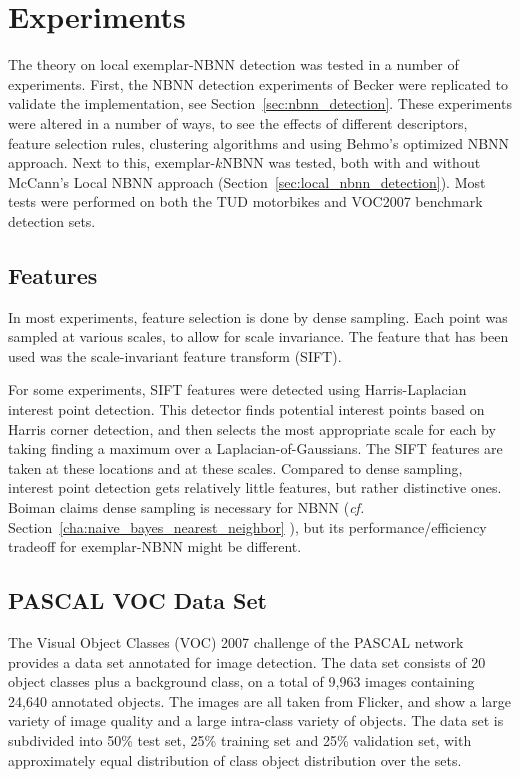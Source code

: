\section{Experiments} %
\label{cha:experimental_setup}

The theory on local exemplar-NBNN detection was tested in a number of experiments. First, the NBNN detection experiments of Becker \cite{becker2012codebook} were replicated to validate the implementation, see Section~\ref{sec:nbnn_detection}. These experiments were altered in a number of ways, to see the effects of different descriptors, feature selection rules, clustering algorithms and using Behmo's optimized NBNN approach. Next to this, exemplar-$k$NBNN was tested, both with and without McCann's Local NBNN approach (Section~\ref{sec:local_nbnn_detection}). Most tests were performed on both the TUD motorbikes and VOC2007 benchmark detection sets.

\subsection{Features} %
\label{sec:features}

In most experiments, feature selection is done by dense sampling. Each point was sampled at various scales, to allow for scale invariance. The feature that has been used was the scale-invariant feature transform (SIFT). \cite{lowe2004distinctive}

For some experiments, SIFT features were detected using Harris-Laplacian interest point detection. \cite{mikolajczyk2005comparison, vandeSande2010colorSIFT} This detector finds potential interest points based on Harris corner detection, and then selects the most appropriate scale for each by taking finding a maximum over a Laplacian-of-Gaussians. The SIFT features are taken at these locations and at these scales. Compared to dense sampling, interest point detection gets relatively little features, but rather distinctive ones. Boiman claims dense sampling is necessary for NBNN (\emph{cf.} Section~\ref{cha:naive_bayes_nearest_neighbor} \cite{boiman2008defense}), but its performance/efficiency tradeoff for exemplar-NBNN might be different.


\subsection{PASCAL VOC Data Set} %

\label{sec:voc_data_set}
The Visual Object Classes (VOC) 2007 challenge of the PASCAL network \cite{pascal-voc-2007} provides a data set annotated for image detection. The data set consists of 20 object classes plus a background class, on a total of 9,963 images containing 24,640 annotated objects. The images are all taken from Flicker, and show a large variety of image quality and a large intra-class variety of objects. The data set is subdivided into 50\% test set, 25\% training set and 25\% validation set, with approximately equal distribution of class object distribution over the sets.

